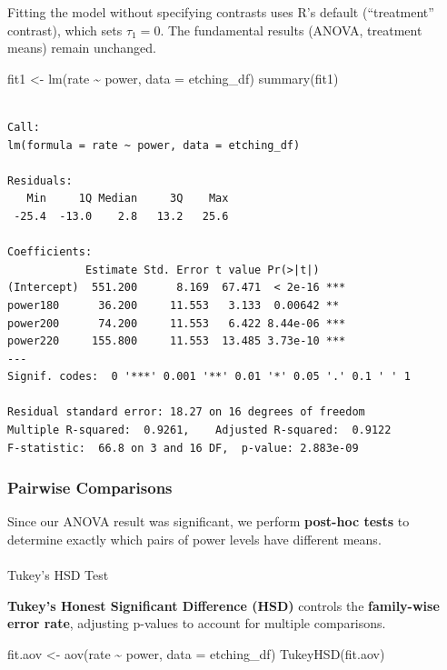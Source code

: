 \documentclass[
  letterpaper,
  DIV=11,
  numbers=noendperiod]{scrreprt}
\makeatletter
\let\oldparagraph\paragraph
\renewcommand{\paragraph}{
    \@ifstar
      \xxxParagraphStar
      \xxxParagraphNoStar
  }
\newcommand{\xxxParagraphStar}[1]{\oldparagraph*{#1}\mbox{}}
\newcommand{\xxxParagraphNoStar}[1]{\oldparagraph{#1}\mbox{}}
\newenvironment{Shaded}{\begin{snugshade}}{\end{snugshade}}
\newcommand{\AttributeTok}[1]{\textcolor[rgb]{0.40,0.45,0.13}{#1}}
\newcommand{\FunctionTok}[1]{\textcolor[rgb]{0.28,0.35,0.67}{#1}}
\newcommand{\NormalTok}[1]{\textcolor[rgb]{0.00,0.23,0.31}{#1}}
\newcommand{\OtherTok}[1]{\textcolor[rgb]{0.00,0.23,0.31}{#1}}
\newcommand{\SpecialCharTok}[1]{\textcolor[rgb]{0.37,0.37,0.37}{#1}}
\makeatother
\begin{document}
Fitting the model without specifying contrasts uses R's default
(``treatment'' contrast), which sets \(\tau_1 = 0\). The fundamental
results (ANOVA, treatment means) remain unchanged.

\begin{Shaded}
\begin{Highlighting}[]
\NormalTok{fit1 }\OtherTok{\textless{}{-}} \FunctionTok{lm}\NormalTok{(rate }\SpecialCharTok{\textasciitilde{}}\NormalTok{ power, }\AttributeTok{data =}\NormalTok{ etching\_df)}
\FunctionTok{summary}\NormalTok{(fit1)}
\end{Highlighting}
\end{Shaded}

\begin{verbatim}

Call:
lm(formula = rate ~ power, data = etching_df)

Residuals:
   Min     1Q Median     3Q    Max 
 -25.4  -13.0    2.8   13.2   25.6 

Coefficients:
            Estimate Std. Error t value Pr(>|t|)    
(Intercept)  551.200      8.169  67.471  < 2e-16 ***
power180      36.200     11.553   3.133  0.00642 ** 
power200      74.200     11.553   6.422 8.44e-06 ***
power220     155.800     11.553  13.485 3.73e-10 ***
---
Signif. codes:  0 '***' 0.001 '**' 0.01 '*' 0.05 '.' 0.1 ' ' 1

Residual standard error: 18.27 on 16 degrees of freedom
Multiple R-squared:  0.9261,    Adjusted R-squared:  0.9122 
F-statistic:  66.8 on 3 and 16 DF,  p-value: 2.883e-09
\end{verbatim}

\subsubsection{Pairwise Comparisons}\label{pairwise-comparisons}

Since our ANOVA result was significant, we perform \textbf{post-hoc
tests} to determine exactly which pairs of power levels have different
means.

\paragraph{Tukey's HSD Test}\label{tukeys-hsd-test}

\textbf{Tukey's Honest Significant Difference (HSD)} controls the
\textbf{family-wise error rate}, adjusting p-values to account for
multiple comparisons.

\begin{Shaded}
\begin{Highlighting}[]
\NormalTok{fit.aov }\OtherTok{\textless{}{-}} \FunctionTok{aov}\NormalTok{(rate }\SpecialCharTok{\textasciitilde{}}\NormalTok{ power, }\AttributeTok{data =}\NormalTok{ etching\_df)}
\FunctionTok{TukeyHSD}\NormalTok{(fit.aov)}
\end{Highlighting}
\end{Shaded}
\end{document}
